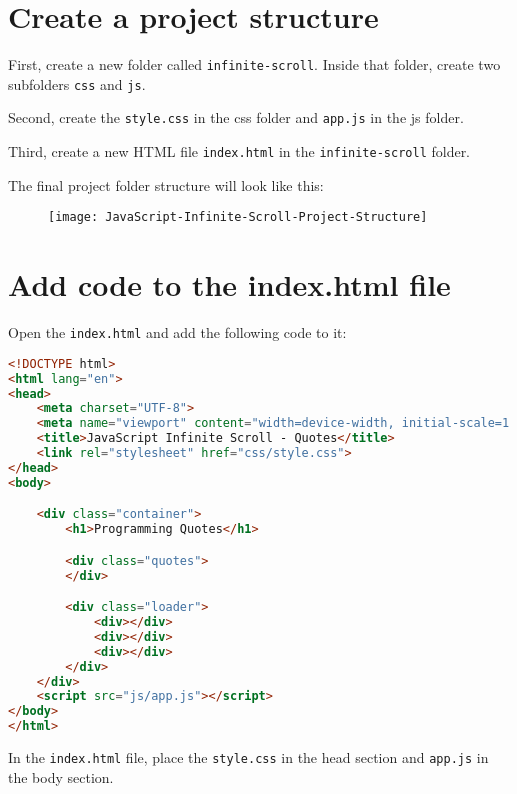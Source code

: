 \documentclass[11pt]{article}
\begin{document}
\section*{Create a project structure}

First, create a new folder called \verb|infinite-scroll|. Inside that folder,
create two subfolders \verb|css| and \verb|js|.
\newline

\noindent
Second, create the \verb|style.css| in the css folder and \verb|app.js| in the js folder.
\newline

\noindent
Third, create a new HTML file \verb|index.html| in the \verb|infinite-scroll| folder.
\newline

\newpage
\noindent
The final project folder structure will look like this:

\begin{figure}[h]
\centering
\texttt{[image: JavaScript-Infinite-Scroll-Project-Structure]}
\end{figure}
\newpage
{}
\section*{Add code to the index.html file}

Open the \verb|index.html| and add the following code to it:

\begin{lstlisting}[language=HTML]
<!DOCTYPE html>
<html lang="en">
<head>
    <meta charset="UTF-8">
    <meta name="viewport" content="width=device-width, initial-scale=1.0">
    <title>JavaScript Infinite Scroll - Quotes</title>
    <link rel="stylesheet" href="css/style.css">
</head>
<body>

    <div class="container">
        <h1>Programming Quotes</h1>

        <div class="quotes">
        </div>

        <div class="loader">
            <div></div>
            <div></div>
            <div></div>
        </div>
    </div>
    <script src="js/app.js"></script>
</body>
</html>
\end{lstlisting}

\noindent
In the \verb|index.html| file, place the \verb|style.css| in the head section
and \verb|app.js| in the body section.
\newline
\end{document}
